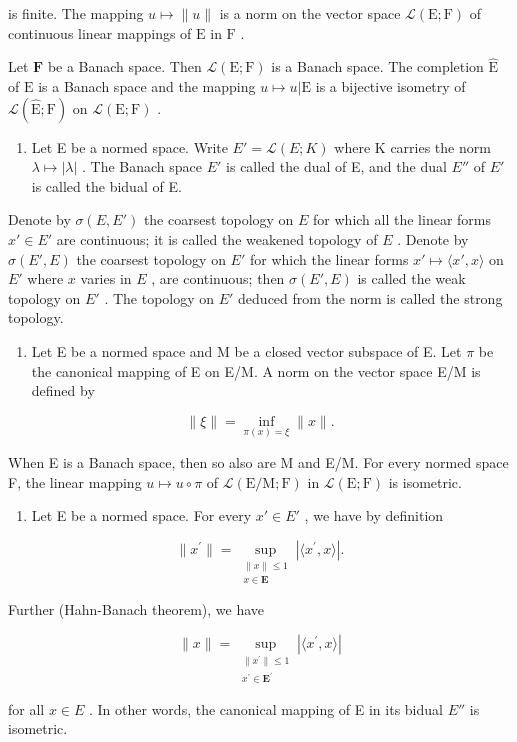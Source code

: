 is finite. The mapping \(u \mapsto \| u \|\) is a norm on the vector space \(\mathcal{L}(\mathrm{E};\mathrm{F})\) of continuous linear mappings of \(\mathrm{E}\) in \(\mathrm{F}\) .

Let \(\mathbf{F}\) be a Banach space. Then \(\mathcal{L}(\mathrm{E};\mathrm{F})\) is a Banach space. The completion \(\hat{\mathrm{E}}\) of \(\mathrm{E}\) is a Banach space and the mapping \(u\mapsto u|\mathrm{E}\) is a bijective isometry of \(\mathcal{L}(\hat{\mathrm{E}};\mathrm{F})\) on \(\mathcal{L}(\mathrm{E};\mathrm{F})\) .

\begin{enumerate}
\def\labelenumi{\arabic{enumi})}
\setcounter{enumi}{1}
\tightlist
\item
  Let E be a normed space. Write \(E' = \mathcal{L}(E; K)\) where K carries the norm \(\lambda \mapsto |\lambda|\) . The Banach space \(E'\) is called the dual of E, and the dual \(E''\) of \(E'\) is called the bidual of E.
\end{enumerate}

Denote by \(\sigma(E, E')\) the coarsest topology on \(E\) for which all the linear forms \(x' \in E'\) are continuous; it is called the weakened topology of \(E\) . Denote by \(\sigma(E', E)\) the coarsest topology on \(E'\) for which the linear forms \(x' \mapsto \langle x', x \rangle\) on \(E'\) where \(x\) varies in \(E\) , are continuous; then \(\sigma(E', E)\) is called the weak topology on \(E'\) . The topology on \(E'\) deduced from the norm is called the strong topology.

\begin{enumerate}
\def\labelenumi{\arabic{enumi})}
\setcounter{enumi}{2}
\tightlist
\item
  Let E be a normed space and M be a closed vector subspace of E. Let \(\pi\) be the canonical mapping of E on E/M. A norm on the vector space E/M is defined by
\end{enumerate}

\[
\| \xi \| = \inf _ {\pi (x) = \xi} \| x \|.\tag{2}
\]

When E is a Banach space, then so also are M and E/M. For every normed space F, the linear mapping \(u \mapsto u \circ \pi\) of \(\mathcal{L}(\mathrm{E}/\mathrm{M}; \mathrm{F})\) in \(\mathcal{L}(\mathrm{E}; \mathrm{F})\) is isometric.

\begin{enumerate}
\def\labelenumi{\arabic{enumi})}
\setcounter{enumi}{3}
\tightlist
\item
  Let E be a normed space. For every \(x' \in E'\) , we have by definition
\end{enumerate}

\[
\| x^{\prime}\| = \sup_{\substack{\| x\| \leqslant 1\\ x\in \mathbf{E}}}\left|\langle x^{\prime},x\rangle \right|.\tag{3}
\]

Further (Hahn-Banach theorem), we have

\[
\| x \| = \sup_{\substack{\| x^{\prime}\| \leqslant 1\\ x^{\prime}\in \mathbf{E}^{\prime}}}\left|\langle x^{\prime},x\rangle \right|\tag{4}
\]

for all \(x \in E\) . In other words, the canonical mapping of E in its bidual \(E''\) is isometric.
